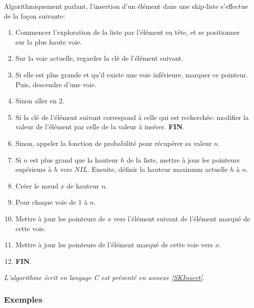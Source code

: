 \documentclass[hidelinks,a4paper, 12pt]{article}
\begin{document}
	Algorithmiquement parlant, l'insertion d'un élément dans une skip-liste s'effectue de la façon suivante:
	\begin{enumerate}
		\item Commencer l'exploration de la liste par l'élément en tête, et se positionner sur la plus haute voie.
		\item Sur la voie actuelle, regarder la clé de l'élément suivant.
		\item Si elle est plus grande et qu'il existe une voie inférieure, marquer ce pointeur. Puis, descendre d'une voie.
		\item Sinon aller en 2.
		\item Si la clé de l'élément suivant correspond à celle qui est recherchée: modifier la valeur de l'élément par celle de la valeur à insérer. \textbf{FIN}.
		\item Sinon, appeler la fonction de probabilité pour récupérer sa valeur $n$.
		\item Si $n$ est plus grand que la hauteur $h$ de la liste, mettre à jour les pointeurs supérieurs à $h$ vers $NIL$. Ensuite, définir la hauteur maximum actuelle $h$ à $n$.
		\item Créer le nœud $x$ de hauteur $n$.
		\item Pour chaque voie de $1$ à $n$.
		\item Mettre à jour les pointeurs de $x$ vers l'élément suivant de l'élément marqué de cette voie.
		\item Mettre à jour les pointeurs de l'élément marqué de cette voie vers $x$.
		\item \textbf{FIN}.
	\end{enumerate}
	\emph{L'algorithme écrit en langage C est présenté en annexe \ref{SKInsert}.}
	
	\newpage
	\subsubsection*{Exemples}	
\end{document}
